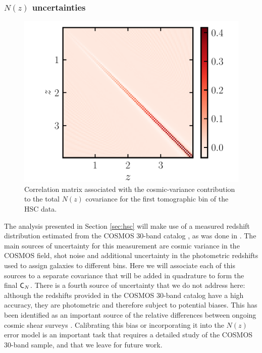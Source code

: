 \documentclass[a4paper,11pt]{article}
\begin{document}
      \subsubsection{$N(z)$ uncertainties}\label{sssec:theory.prior.cv}
        \begin{figure}[ht]
          \centering  
          \includegraphics[width=1.\textwidth]{./corr_CV_0}
          \caption{Correlation matrix associated with the cosmic-variance contribution to the total $N(z)$ covariance for the first tomographic bin of the HSC data.}\label{fig:CV}
        \end{figure}
        The analysis presented in Section \ref{sec:hsc} will make use of a measured redshift distribution estimated from the COSMOS 30-band catalog \cite{2016ApJS..224...24L}, as was done in \cite{1912.08209}. The main sources of uncertainty for this measurement are cosmic variance in the COSMOS field, shot noise and additional uncertainty in the photometric redshifts used to assign galaxies to different bins. Here we will associate each of this sources to a separate covariance that will be added in quadrature to form the final ${\sf C}_N$. There is a fourth source of uncertainty that we do not address here: although the redshifts provided in the COSMOS 30-band catalog have a high accuracy, they are photometric and therefore subject to potential biases. This has been identified as an important source of the relative differences between ongoing cosmic shear surveys \citep{2020A&A...638L...1J}. Calibrating this bias or incorporating it into the $N(z)$ error model is an important task that requires a detailed study of the COSMOS 30-band sample, and that we leave for future work.
        
\end{document}
